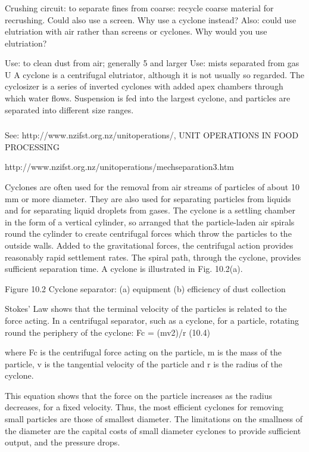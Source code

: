 \begin{frame}\frametitle{}
	Crushing circuit: to separate fines from coarse: recycle coarse material for recrushing. Could also use a screen. Why use a cyclone instead?
	Also: could use elutriation with air rather than screens or cyclones. Why would you use elutriation?

	Use: to clean dust from air; generally 5 \micron and larger
	Use: mists separated from gas
	U
	A cyclone is a centrifugal elutriator, although it is not usually so regarded. The cyclosizer is a series of inverted cyclones with added apex chambers through which water flows. Suspension is fed into the largest cyclone, and particles are separated into different size ranges.	
\end{frame}

\begin{frame}\frametitle{}
	See: http://www.nzifst.org.nz/unitoperations/, UNIT OPERATIONS IN FOOD PROCESSING
	
	http://www.nzifst.org.nz/unitoperations/mechseparation3.htm

	Cyclones are often used for the removal from air streams of particles of about 10 mm or more diameter. They are also used for separating particles from liquids and for separating liquid droplets from gases. The cyclone is a settling chamber in the form of a vertical cylinder, so arranged that the particle-laden air spirals round the cylinder to create centrifugal forces which throw the particles to the outside walls. Added to the gravitational forces, the centrifugal action provides reasonably rapid settlement rates. The spiral path, through the cyclone, provides sufficient separation time. A cyclone is illustrated in Fig. 10.2(a).


	Figure 10.2 Cyclone separator: (a) equipment (b) efficiency of dust collection


	Stokes' Law shows that the terminal velocity of the particles is related to the force acting. In a centrifugal separator, such as a cyclone, for a particle, rotating round the periphery of the cyclone:
	           Fc = (mv2)/r                                                                                                         (10.4)

	where Fc is the centrifugal force acting on the particle, m is the mass of the particle, v is the tangential velocity of the particle and r is the radius of the cyclone.

	This equation shows that the force on the particle increases as the radius decreases, for a fixed velocity. Thus, the most efficient cyclones for removing small particles are those of smallest diameter. The limitations on the smallness of the diameter are the capital costs of small diameter cyclones to provide sufficient output, and the pressure drops.


\end{frame}
